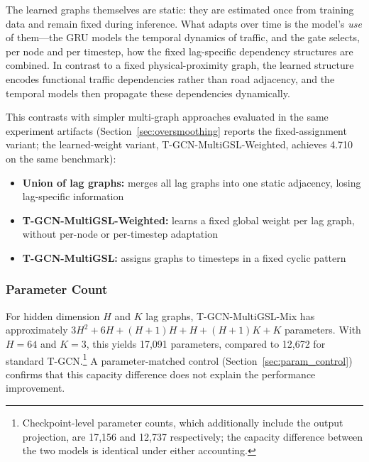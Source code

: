 The learned graphs themselves are static: they are estimated once from training data and remain fixed during inference. What adapts over time is the model's \emph{use} of them---the GRU models the temporal dynamics of traffic, and the gate selects, per node and per timestep, how the fixed lag-specific dependency structures are combined. In contrast to a fixed physical-proximity graph, the learned structure encodes functional traffic dependencies rather than road adjacency, and the temporal models then propagate these dependencies dynamically.

This contrasts with simpler multi-graph approaches evaluated in the same experiment artifacts (Section~\ref{sec:oversmoothing} reports the fixed-assignment variant; the learned-weight variant, T-GCN-MultiGSL-Weighted, achieves 4.710 on the same benchmark):
\begin{itemize}
    \item \textbf{Union of lag graphs:} merges all lag graphs into one static adjacency, losing lag-specific information
    \item \textbf{T-GCN-MultiGSL-Weighted:} learns a fixed global weight per lag graph, without per-node or per-timestep adaptation
    \item \textbf{T-GCN-MultiGSL:} assigns graphs to timesteps in a fixed cyclic pattern
\end{itemize}

\subsubsection{Parameter Count}

For hidden dimension $H$ and $K$ lag graphs, T-GCN-MultiGSL-Mix has approximately $3H^2 + 6H + (H+1)H + H + (H+1)K + K$ parameters. With $H=64$ and $K=3$, this yields 17,091 parameters, compared to 12,672 for standard T-GCN.\footnote{Checkpoint-level parameter counts, which additionally include the output projection, are 17,156 and 12,737 respectively; the capacity difference between the two models is identical under either accounting.} A parameter-matched control (Section~\ref{sec:param_control}) confirms that this capacity difference does not explain the performance improvement.
